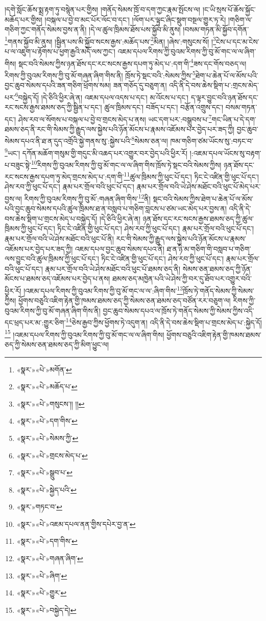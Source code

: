 །དགེ་སློང་ཆོས་སྨྲ་རྟག་ཏུ་བསྙེན་པར་གྱིས། །གནོད་སེམས་ཁྲོ་བ་དག་ཀྱང་རྣམ་སྤོངས་ལ། །ང་ཡི་སྲས་པོ་ཆོས་སྐྱོང་མཆོད་པར་གྱིས། །བསྐལ་པ་བྱེ་བ་མང་པོར་ལོང་བ་དང་། །ལོག་པར་ལྟུང་ཞིང་སྡུག་བསྔལ་གྱུར་ཏ་རེ། །གཅིག་ལ་གཅིག་ཀྱང་གནོད་སེམས་བྱས་ན་ནི། །དེ་ལ་ཚུལ་ཁྲིམས་ཐོས་པས་སྐྱོབ་མི་ནུས། །བསམ་གཏན་མི་སྐྱོབ་དགོན་\footnote{«སྣར་»«པེ་»མགོན་}གནས་སྐྱོབ་མི་ནུས། །སྦྱིན་པས་མི་སྐྱོབ་སངས་རྒྱས་:མཆོད་པས་\footnote{«སྣར་»«པེ་»མཆོད་པ་}མིན། །ཞེས་:གསུངས་སོ། །\footnote{«སྣར་»«པེ་»གསུངས་།། །།}ངེས་པ་དང་མ་ངེས་པ་ལ་འཇུག་པ་རྟོགས་པ་ཕྱག་རྒྱའི་མདོ་ལས་ཀྱང་། འཇམ་དཔལ་རིགས་ཀྱི་བུའམ་རིགས་ཀྱི་བུ་མོ་གང་ལ་ལ་ཞིག་གིས། སྡང་བའི་སེམས་ཀྱིས་ཉན་ཐོས་དང་རང་སངས་རྒྱས་དཔག་ཏུ་མེད་པ་:དག་གི་\footnote{«སྣར་»«པེ་»དག་གིས་}ཟས་དང་གོས་བཅད་ལ། རིགས་ཀྱི་བུའམ་རིགས་ཀྱི་བུ་མོ་གཞན་ཞིག་གིས་ནི། ཁྲོས་ཏེ་སྡང་བའི་:སེམས་ཀྱིས་\footnote{«སྣར་»«པེ་»སེམས་ཀྱི་}ཐེག་པ་ཆེན་པོ་ལ་མོས་པའི་བྱང་ཆུབ་སེམས་དཔའི་ཟན་གཅིག་ཕྲོགས་སམ། ཟན་གཅོད་དུ་བཅུག་ན། འདི་ནི་དེ་བས་ཆེས་སྡིག་པ་:གྲངས་མེད་པར་\footnote{«སྣར་»«པེ་»གྲངས་མེད་པ་}བསྐྱེད་དོ། །དེ་ཅིའི་ཕྱིར་ཞེ་ན། འཇམ་དཔལ་འདས་པ་དང་། མ་འོངས་པ་དང་། ད་ལྟར་བྱུང་བའི་ཉན་ཐོས་དང་རང་སངས་རྒྱས་ཐམས་ཅད་ཀྱི་སྦྱིན་པ་དང་། ཚུལ་ཁྲིམས་དང་། བཟོད་པ་དང་། བརྩོན་འགྲུས་དང་། བསམ་གཏན་དང་། ཤེས་རབ་ལ་སོགས་པ་བསྐལ་པ་བྱེ་བ་གྲངས་མེད་པ་ནས། ཡང་དག་པར་:བསྒྲུབས་པ་\footnote{«སྣར་»«པེ་»སྒྲུབ་པ་}གང་ཡིན་པ་དེ་དག་ཐམས་ཅད་ནི་རང་གི་སེམས་ཀྱི་རྒྱུད་ལས་སྐྱེས་པའི་ཉོན་མོངས་པ་རྣམས་འཇོམས་པར་བྱེད་པར་ཟད་ཀྱི། བྱང་ཆུབ་སེམས་དཔའ་ནི་ཐ་ན་དུད་འགྲོའི་སྐྱེ་གནས་སུ་:སྐྱེས་པའི་\footnote{«སྣར་»«པེ་»སྐྱེད་པའི་}སེམས་ཅན་ལ། ཁམ་གཅིག་ཙམ་ཡོངས་སུ་:བཏང་བ་\footnote{«སྣར་»གཏང་བ་}ཡང་། དཀོན་མཆོག་གསུམ་གྱི་གདུང་མི་འཆད་པར་འགྱུར་བར་བྱེད་པའི་ཕྱིར་རོ། །:འཇམ་དཔལ་ཡོངས་སུ་བརྟག་པ་བཟུང་སྟེ་\footnote{«སྣར་»«པེ་»འཇམ་དཔལ་ནན་གྱིས་དཔེར་བྱ་ན་}རིགས་ཀྱི་བུའམ་རིགས་ཀྱི་བུ་མོ་གང་ལ་ལ་ཞིག་གིས་ཁྲོས་ཏེ་སྡང་བའི་སེམས་ཀྱིས། ཉན་ཐོས་དང་རང་སངས་རྒྱས་དཔག་ཏུ་མེད་གྲངས་མེད་པ་:དག་གི་\footnote{«སྣར་»«པེ་»དག་གིས་}ཚུལ་ཁྲིམས་ཀྱི་ཕུང་པོ་དང་། ཏིང་ངེ་འཛིན་གྱི་ཕུང་པོ་དང་། ཤེས་རབ་ཀྱི་ཕུང་པོ་དང་། རྣམ་པར་གྲོལ་བའི་ཕུང་པོ་དང་། རྣམ་པར་གྲོལ་བའི་ཡེ་ཤེས་མཐོང་བའི་ཕུང་པོ་མེད་པར་བྱས་ལ། རིགས་ཀྱི་བུའམ་རིགས་ཀྱི་བུ་མོ་:གཞན་ཞིག་གིས་\footnote{«སྣར་»«པེ་»གཞན་ཞིག་}ནི། སྡང་བའི་སེམས་ཀྱིས་ཐེག་པ་ཆེན་པོ་ལ་མོས་པའི་བྱང་ཆུབ་སེམས་དཔའི་ཚུལ་ཁྲིམས་ཐ་ན་བསླབ་པ་གཅིག་བླངས་པ་ཙམ་ཡང་མེད་པར་བྱས་ན། འདི་ནི་དེ་བས་ཆེས་སྡིག་པ་གྲངས་མེད་པ་བསྐྱེད་དོ། །དེ་ཅིའི་ཕྱིར་ཞེ་ན། ཉན་ཐོས་དང་རང་སངས་རྒྱས་ཐམས་ཅད་ཀྱི་ཚུལ་ཁྲིམས་ཀྱི་ཕུང་པོ་དང་། ཏིང་ངེ་འཛིན་གྱི་ཕུང་པོ་དང་། ཤེས་རབ་ཀྱི་ཕུང་པོ་དང་། རྣམ་པར་གྲོལ་བའི་ཕུང་པོ་དང་། རྣམ་པར་གྲོལ་བའི་ཡེ་ཤེས་མཐོང་བའི་ཕུང་པོ་ནི། རང་གི་སེམས་ཀྱི་རྒྱུད་ལས་སྐྱེས་པའི་ཉོན་མོངས་པ་རྣམས་འཇོམས་པར་བྱེད་པར་ཟད་ཀྱི། འཇམ་དཔལ་བྱང་ཆུབ་སེམས་དཔའ་ནི། ཐ་ན་ཉི་མ་གཅིག་གི་བསླབ་པ་གཅིག་ལས་བྱུང་བའི་ཚུལ་ཁྲིམས་ཀྱི་ཕུང་པོ་དང་། ཏིང་ངེ་འཛིན་གྱི་ཕུང་པོ་དང་། ཤེས་རབ་ཀྱི་ཕུང་པོ་དང་། རྣམ་པར་གྲོལ་བའི་ཕུང་པོ་དང་། རྣམ་པར་གྲོལ་བའི་ཡེ་ཤེས་མཐོང་བའི་ཕུང་པོ་ཐམས་ཅད་ནི། སེམས་ཅན་ཐམས་ཅད་ཀྱི་ཉོན་མོངས་པ་ཐམས་ཅད་འཇོམས་པར་བྱེད་པ་ནས། ཐམས་ཅད་མཁྱེན་པའི་ཡེ་ཤེས་ཀྱི་བར་དུ་ཐོབ་པར་འགྱུར་བའི་ཕྱིར་རོ། །འཇམ་དཔལ་རིགས་ཀྱི་བུའམ་རིགས་ཀྱི་བུ་མོ་གང་ལ་ལ་:ཞིག་གིས་\footnote{«སྣར་»«པེ་»ཞིག་}ཁྲོས་ཏེ་གནོད་སེམས་ཀྱི་སེམས་ཀྱིས། ཕྱོགས་བཅུའི་འཇིག་རྟེན་གྱི་ཁམས་ཐམས་ཅད་ཀྱི་སེམས་ཅན་ཐམས་ཅད་བཙོན་རར་བཅུག་ལ། རིགས་ཀྱི་བུའམ་རིགས་ཀྱི་བུ་མོ་གཞན་ཞིག་གིས་ནི། བྱང་ཆུབ་སེམས་དཔའ་ལ་ཁྲོས་ཏེ་གནོད་སེམས་ཀྱི་སེམས་ཀྱིས་འདི་དང་ཕྲད་པར་མ་:གྱུར་ཅིག་\footnote{«སྣར་»«པེ་»གྱུར་}ཅེས་རྒྱབ་ཀྱིས་ཕྱོགས་ཏེ་འདུག་ན། འདི་ནི་དེ་བས་ཆེས་སྡིག་པ་གྲངས་མེད་པ་:སྐྱེད་དོ།\footnote{«སྣར་»«པེ་»བསྐྱེད་དེ།} །འཇམ་དཔལ་རིགས་ཀྱི་བུའམ་རིགས་ཀྱི་བུ་མོ་གང་ལ་ལ་ཞིག་གིས། ཕྱོགས་བཅུའི་འཇིག་རྟེན་གྱི་ཁམས་ཐམས་ཅད་ཀྱི་སེམས་ཅན་ཐམས་ཅད་ཀྱི་མིག་ཕྱུང་ལ། 